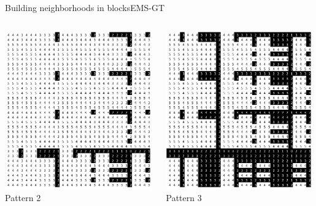 \documentclass[pdf,xcolor={dvipsnames}]{beamer}
\begin{document}
\begin{frame}{Building neighborhoods in blocks}{EMS-GT}
{\begin{columns}
		\begin{column}{.135\textwidth}\centering\includegraphics[width=0.98\textwidth]{img/2}\\Pattern 2 \end{column}
		\begin{column}{.135\textwidth}\centering\includegraphics[width=0.98\textwidth]{img/3}\\Pattern 3 \end{column}

\end{columns}}
\end{frame}
\end{document}
